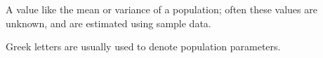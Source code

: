  A value like the mean or variance of a population; often these
values are unknown, and are estimated using sample data.
\par
Greek letters are usually used to denote population
parameters.

